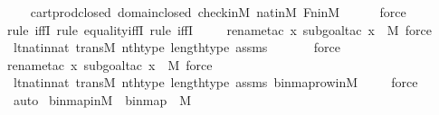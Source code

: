 \begin{isabellebody}
\ \ \isamarkupfalse%
\ cartprod{\isacharunderscore}{\kern0pt}closed\ domain{\isacharunderscore}{\kern0pt}closed\ check{\isacharunderscore}{\kern0pt}in{\isacharunderscore}{\kern0pt}M\ nat{\isacharunderscore}{\kern0pt}in{\isacharunderscore}{\kern0pt}M\ Fn{\isacharunderscore}{\kern0pt}in{\isacharunderscore}{\kern0pt}M\ \isanewline
\ \ \ \isamarkupfalse%
\ force\ \isanewline
\ \ \isamarkupfalse%
{\isacharparenleft}{\kern0pt}rule\ iffI{\isacharcomma}{\kern0pt}\ rule\ equality{\isacharunderscore}{\kern0pt}iffI{\isacharcomma}{\kern0pt}\ rule\ iffI{\isacharparenright}{\kern0pt}\isanewline
\ \ \ \ \isamarkupfalse%
{\isacharparenleft}{\kern0pt}rename{\isacharunderscore}{\kern0pt}tac\ x{\isacharcomma}{\kern0pt}\ subgoal{\isacharunderscore}{\kern0pt}tac\ {\isachardoublequoteopen}x\ {\isasymin}\ M{\isachardoublequoteclose}{\isacharcomma}{\kern0pt}\ force{\isacharparenright}{\kern0pt}\isanewline
\ \ \isamarkupfalse%
\ lt{\isacharunderscore}{\kern0pt}nat{\isacharunderscore}{\kern0pt}in{\isacharunderscore}{\kern0pt}nat\ transM\ nth{\isacharunderscore}{\kern0pt}type\ length{\isacharunderscore}{\kern0pt}type\ assms\ \isanewline
\ \ \ \ \isamarkupfalse%
\ force\isanewline
\ \ \ \isamarkupfalse%
{\isacharparenleft}{\kern0pt}rename{\isacharunderscore}{\kern0pt}tac\ x{\isacharcomma}{\kern0pt}\ subgoal{\isacharunderscore}{\kern0pt}tac\ {\isachardoublequoteopen}x\ {\isasymin}\ M{\isachardoublequoteclose}{\isacharcomma}{\kern0pt}\ force{\isacharparenright}{\kern0pt}\isanewline
\ \ \isamarkupfalse%
\ lt{\isacharunderscore}{\kern0pt}nat{\isacharunderscore}{\kern0pt}in{\isacharunderscore}{\kern0pt}nat\ transM\ nth{\isacharunderscore}{\kern0pt}type\ length{\isacharunderscore}{\kern0pt}type\ assms\ binmap{\isacharunderscore}{\kern0pt}row{\isacharprime}{\kern0pt}{\isacharunderscore}{\kern0pt}in{\isacharunderscore}{\kern0pt}M\isanewline
\ \ \ \isamarkupfalse%
\ force\isanewline
\ \ \isamarkupfalse%
\ auto%
\endisatagproof
{\isafoldproof}%
%
\isadelimproof
\isanewline
%
\endisadelimproof
\isanewline
{}\isamarkupfalse%
\ binmap{\isacharprime}{\kern0pt}{\isacharunderscore}{\kern0pt}in{\isacharunderscore}{\kern0pt}M\ {\isacharcolon}{\kern0pt}\ {\isachardoublequoteopen}binmap{\isacharprime}{\kern0pt}\ {\isasymin}\ M{\isachardoublequoteclose}\ \isanewline
%
\isadelimproof
%
\endisadelimproof
%
\isatagproof
{}\isamarkupfalse%
\ {\isacharminus}{\kern0pt}\ \isanewline
\ \ \isamarkupfalse%

\end{isabellebody}
